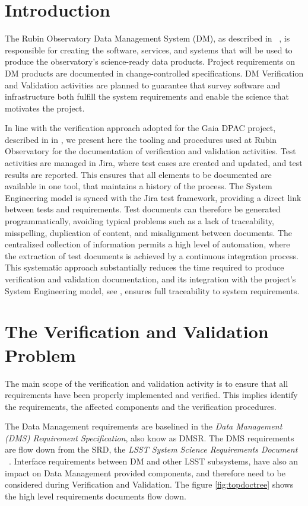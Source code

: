 \section{Introduction}

The Rubin Observatory Data Management System (DM), as described in~\cite{2015arXiv151207914J} ,
is responsible for creating the software, services, and systems that will be used to
produce the observatory's science-ready data products.  Project requirements on DM
products are documented in change-controlled specifications. DM Verification and Validation activities are planned
to guarantee that survey software and infrastructure both fulfill the system requirements and enable the science that
motivates the project.

In line with the verification approach adopted for the Gaia DPAC project, described in in \cite{10.1117/12.926797} , 
we present here the tooling and procedures used at Rubin Observatory for the documentation of verification and
validation activities. Test activities are managed in Jira, where test cases are created and updated, and test results
are reported. This ensures that all elements to be documented are available in one tool, that maintains a history of
the process. The System Engineering model is synced with the Jira test framework, providing a direct link between
tests and requirements. Test documents can therefore be generated programmatically, avoiding typical problems
such as a lack of traceability, misspelling, duplication of content, and misalignment between documents. The
centralized collection of information permits a high level of automation, where the extraction of test documents is
achieved by a continuous integration process. This systematic approach substantially reduces the time required to
produce verification and validation documentation, and its integration with the project's System Engineering model, 
see \cite{10.1117/12.2310125} , ensures full traceability to system requirements.

\section{The Verification and Validation Problem}

The main scope of the verification and validation activity is to ensure that all requirements have been properly implemented and verified.
This implies identify the requirements, the affected components and the verification procedures.

The Data Management requirements are baselined in the \textit{Data Management (DMS) Requirement Specification}\cite{LSE-61}, also know as DMSR.
The DMS requirements are flow down from the SRD, the \textit{LSST System Science Requirements Document} \cite{LPM-17}~. 
Interface requirements between DM and other LSST subsystems, have also an impact on Data Management provided components, 
and therefore need to be considered during Verification and Validation. 
The figure \ref{fig:topdoctree} shows the high level requirements documents flow down.

